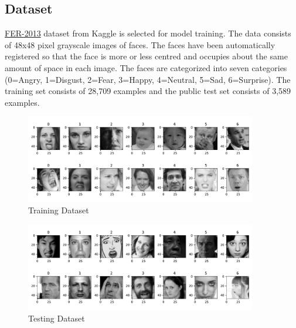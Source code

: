 \documentclass[11pt,a4paper]{article}
\begin{document}
    \subsection{Dataset}
    \href{https://www.kaggle.com/datasets/msambare/fer2013}{FER-2013} \cite{FER2013} dataset from Kaggle is selected for model training. The data consists of 48x48 pixel grayscale images of faces. The faces have been automatically registered so that the face is more or less centred and occupies about the same amount of space in each image. The faces are categorized into seven categories (0=Angry, 1=Disgust, 2=Fear, 3=Happy, 4=Neutral, 5=Sad, 6=Surprise). The training set consists of 28,709 examples and the public test set consists of 3,589 examples. 
    \begin{figure}[H]
        \centering
        \includegraphics[width = 0.9\textwidth]{emotion_detection/plot/train.pdf}
        \caption{Training Dataset}
        \label{fig:train_dataset}
    \end{figure}
    \begin{figure}[H]
        \centering
        \includegraphics[width = 0.9\textwidth]{emotion_detection/plot/test.pdf}
        \caption{Testing Dataset}
        \label{fig:test_dataset}
    \end{figure}
    
    
\end{document}
